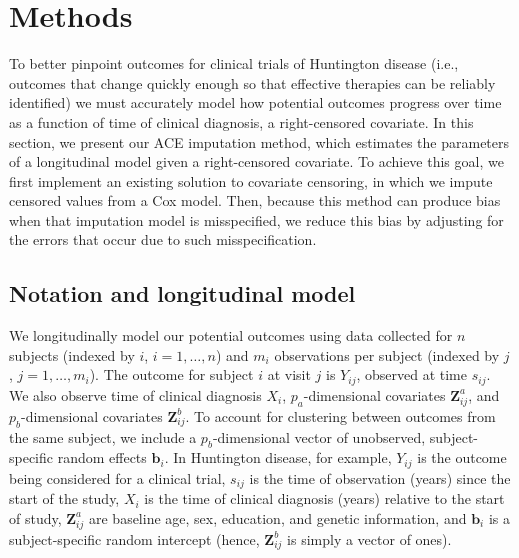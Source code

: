 \documentclass[12pt]{article}
\def\bb{{\boldsymbol b}}
\def\bZ{{\boldsymbol Z}}
\begin{document}

\section{Methods}
\label{sec:methods}
To better pinpoint outcomes for clinical trials of Huntington disease (i.e., outcomes that change quickly enough so that effective therapies can be reliably identified) we must accurately model how potential outcomes progress over time as a function of time of clinical diagnosis, a right-censored covariate. In this section, we present our ACE imputation method, which estimates the parameters of a longitudinal model given a right-censored covariate. To achieve this goal, we first implement an existing solution to covariate censoring, in which we impute censored values from a Cox model. Then, because this method can produce bias when that imputation model is misspecified, we reduce this bias by adjusting for the errors that occur due to such misspecification. 

\subsection{Notation and longitudinal model}
\label{sec:notation}
We longitudinally model our potential outcomes using data collected for $n$ subjects (indexed by $i$, $i=1,\ldots,n$) and $m_i$ observations per subject (indexed by $j$, $j=1,\ldots,m_i$). The outcome for subject $i$ at visit $j$ is $Y_{ij}$, observed at time $s_{ij}$. We also observe time of clinical diagnosis $X_i$, $p_a$-dimensional covariates $\bZ^a_{ij}$, and $p_b$-dimensional covariates $\bZ^b_{ij}$. To account for clustering between outcomes from the same subject, we include a $p_b$-dimensional vector of unobserved, subject-specific random effects $\bb_i$. In Huntington disease, for example, $Y_{ij}$  is the outcome being considered for a clinical trial, $s_{ij}$ is the time of observation (years) since the start of the study, $X_i$ is the time of clinical diagnosis (years) relative to the start of study, $\bZ^a_{ij}$ are baseline age, sex, education, and genetic information, and $\bb_i$ is a subject-specific random intercept (hence, $\bZ^b_{ij}$ is simply a vector of ones).
\end{document}
